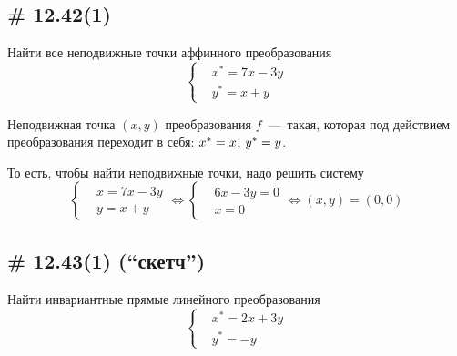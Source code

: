 \documentclass[a4paper,12pt]{article}
\begin{document}
  \subsection{\# 12.42(1)}
  
  Найти все неподвижные точки аффинного преобразования
  \[
    \left\{
      \begin{aligned}
        &x^* = 7x - 3y\\
        &y^* = x + y
      \end{aligned}
    \right.
  \]
  
  \begin{solution}
    \begin{definition}
      Неподвижная точка $(x, y)$ преобразования $f$~---~такая, которая под действием преобразования переходит в себя: $x^* \hm= x$, $y^* \hm= y$.
    \end{definition}
    
    То есть, чтобы найти неподвижные точки, надо решить систему
    \[
      \left\{
        \begin{aligned}
          &x = 7x - 3y\\
          &y = x + y
        \end{aligned}
      \right.
      \Leftrightarrow
      \left\{
        \begin{aligned}
          &6x - 3y = 0\\
          &x = 0
        \end{aligned}
      \right.
      \Leftrightarrow
      (x, y) = (0, 0)
    \]
  \end{solution}
  
  
  \subsection{\# 12.43(1) (``скетч'')}
  
  Найти инвариантные прямые линейного преобразования
  \[
    \left\{
      \begin{aligned}
        &x^* = 2x + 3y\\
        &y^* = -y
      \end{aligned}
    \right.
  \]
  
\end{document}
